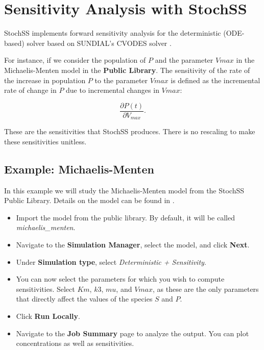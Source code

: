 \chapter{Sensitivity Analysis with StochSS}

StochSS implements forward sensitivity analysis for the deterministic (ODE-based) solver based on SUNDIAL's CVODES solver \cite{sundials}.

For instance, if we consider the population of $P$ and the parameter $Vmax$ in the Michaelis-Menten model in the \textbf{Public Library}. The sensitivity of the rate of the increase in population $P$ to the parameter $Vmax$ is defined as the incremental rate of change in $P$ due to incremental changes in $Vmax$:

\begin{equation}
\frac{\partial P(t)}{\partial V_{max}}.
\end{equation}

These are the sensitivities that StochSS produces. There is no rescaling to make these sensitivities unitless.

\section{Example: Michaelis-Menten}

In this example we will study the Michaelis-Menten model from the StochSS Public Library. Details on the model can be found in \cite{wiki-michaelis-menten}.
\begin{itemize}
\item Import the model from the public library. By default, it will be called \textit{michaelis\_menten}.
\item Navigate to the \textbf{Simulation Manager}, select the model, and click \textbf{Next}.
\item Under \textbf{Simulation type}, select \textit{Deterministic + Sensitivity}.
\item You can now select the parameters for which you wish to compute sensitivities. Select $Km$, $k3$, $mu$, and $Vmax$, as these are the only parameters that directly affect the values of the species $S$ and $P$.
\item Click \textbf{Run Locally}. 
\item Navigate to the \textbf{Job Summary} page to analyze the output. You can plot concentrations as well as sensitivities.
\end{itemize}

